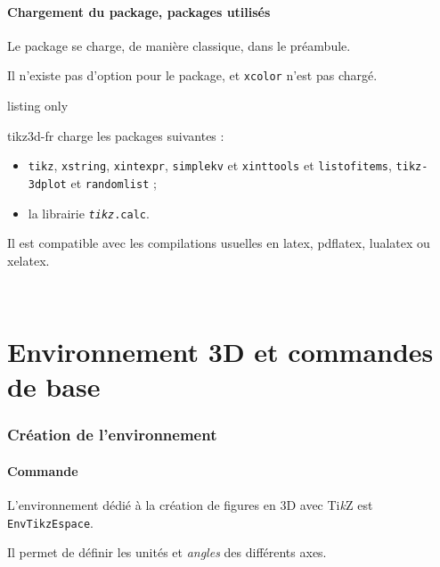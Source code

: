 \documentclass[french,a4paper,11pt]{article}
\providecommand\tikzlogo{Ti\textit{k}Z}
\let\TikZ\tikzlogo
\begin{document}
\subsection{Chargement du package, packages utilisés}

\begin{importantblock}
Le package se charge, de manière classique, dans le préambule.

Il n'existe pas d'option pour le package, et \texttt{xcolor} n'est pas chargé.
\end{importantblock}

\begin{PresCodeTex}{listing only}
\usepackage{tikz3d-fr}
\end{PresCodeTex}

\begin{noteblock}
\textsf{tikz3d-fr} charge les packages suivantes :

\begin{itemize}
	\item \texttt{tikz}, \texttt{xstring}, \texttt{xintexpr}, \texttt{simplekv} et \texttt{xinttools} et \texttt{listofitems}, \texttt{tikz-3dplot} et \texttt{randomlist}  ;
	\item la librairie \texttt{\textit{tikz}.calc}.
\end{itemize}

Il est compatible avec les compilations usuelles en \textsf{latex}, \textsf{pdflatex}, \textsf{lualatex} ou \textsf{xelatex}.
\end{noteblock}

\vfill~

\pagebreak

\part{Environnement 3D et commandes de base}

\section{Création de l'environnement}

\subsection{Commande}

\begin{cautionblock}
L'environnement dédié à la création de figures en 3D avec \TikZ{} est \texttt{EnvTikzEspace}.

Il permet de définir les unités et \textit{angles} des différents axes.
\end{cautionblock}
\end{document}
